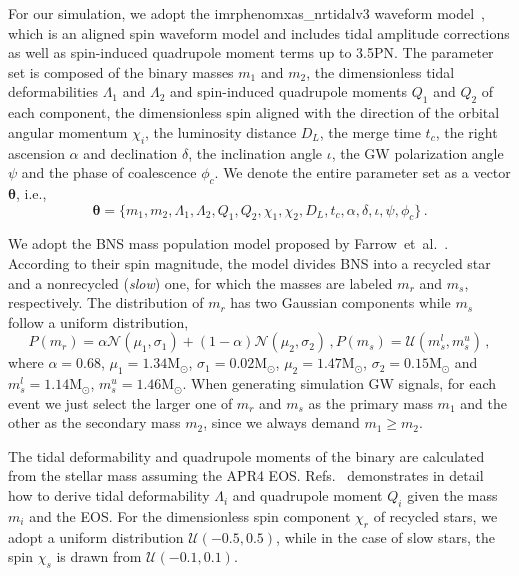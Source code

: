 \documentclass[a4paper,11pt]{article}
\begin{document}
For our simulation, we adopt the {\sc imrphenomxas\_nrtidalv3} waveform model~\cite{Abac:2023ujg}, which is an aligned spin waveform model and includes tidal amplitude corrections as well as spin-induced quadrupole moment terms up to 3.5PN. The parameter set is composed of the binary masses $m_1$ and $m_2$, the dimensionless tidal deformabilities $\Lambda_1$ and $\Lambda_2$ and spin-induced quadrupole moments $Q_1$ and $Q_2$ of each component, the dimensionless spin aligned with the direction of the orbital angular momentum $\chi_i$, the luminosity distance $D_L$, the merge time $t_c$, the right ascension $\alpha$ and declination $\delta$, the inclination angle $\iota$, the GW polarization angle $\psi$ and the phase of coalescence $\phi_c$. We denote the entire parameter set as a vector $\bm{\theta}$, i.e.,
\begin{equation}
\label{parameter set}
\bm{\theta} = \{m_1,m_2,\Lambda_1,\Lambda_2,Q_1,Q_2,\chi_1,\chi_2,D_L,t_c,\alpha,\delta,\iota,\psi,\phi_c\}\,.
\end{equation}

We adopt the BNS mass population model proposed by Farrow~et~al.~\cite{Farrow:2019xnc}. According to their spin magnitude, the model divides BNS into a recycled star and a nonrecycled (\emph{slow}) one, for which the masses are labeled $m_r$ and $m_s$, respectively. The distribution of $m_r$ has two Gaussian components while $m_s$ follow a uniform distribution,
\begin{subequations}
\label{mass population}
\begin{equation}
    P(m_r) = \alpha \mathcal{N}(\mu_1, \sigma_1) + (1-\alpha) \mathcal{N}(\mu_2, \sigma_2)\,,
\end{equation}
\begin{equation}
    P(m_s) = \mathcal{U}(m_s^l, m_s^u)\,,
\end{equation}
\end{subequations}
where $\alpha=0.68$, $\mu_1=1.34\mathrm{M}_{\odot}$, $\sigma_1=0.02\mathrm{M}_{\odot}$, $\mu_2=1.47\mathrm{M}_{\odot}$, $\sigma_2=0.15\mathrm{M}_{\odot}$ and $m_s^l=1.14\mathrm{M}_{\odot}$, $m_s^u=1.46\mathrm{M}_{\odot}$. When generating simulation GW signals, for each event we just select the larger one of $m_r$ and $m_s$ as the primary mass $m_1$ and the other as the secondary mass $m_2$, since we always demand $m_1 \geq m_2$.

The tidal deformability and quadrupole moments of the binary are calculated from the stellar mass assuming the APR4 EOS. Refs.~\cite{Yagi:2013awa,Atta:2024ckt} demonstrates in detail how to derive tidal deformability $\Lambda_i$ and quadrupole moment $Q_i$ given the mass $m_i$ and the EOS. For the dimensionless spin component $\chi_r$ of recycled stars, we adopt a uniform distribution $\mathcal{U}(-0.5,0.5)$, 
while in the case of slow stars, the spin $\chi_s$ is drawn from $\mathcal{U}(-0.1,0.1)$.
\end{document}
